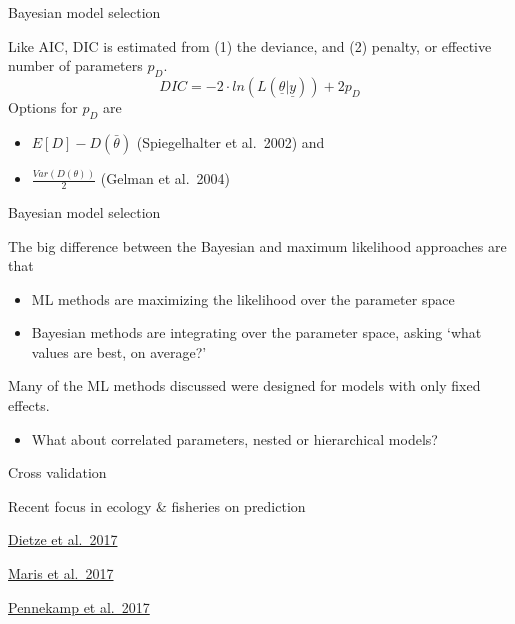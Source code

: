 \documentclass[ignorenonframetext,]{beamer}
\providecommand{\tightlist}{%
  \setlength{\itemsep}{0pt}\setlength{\parskip}{0pt}}
\begin{document}
\begin{frame}[fragile]
\begin{block}{Bayesian model selection}

Like AIC, DIC is estimated from (1) the deviance, and (2) penalty, or
effective number of parameters \(p_{D}\).
\[DIC = -2\cdot ln\left( L(\underline { \theta } |\underline { y  } ) \right) + 2p_{D}\]
Options for \(p_{D}\) are

\begin{itemize}
\item
  \(E[D]-D\left( \bar { \theta } \right)\) (Spiegelhalter et al.~2002)
  and
\item
  \(\frac { Var(D\left( \theta \right) ) }{ 2 }\) (Gelman et al.~2004)
\end{itemize}

\end{block}

\begin{block}{Bayesian model selection}

The big difference between the Bayesian and maximum likelihood
approaches are that

\begin{itemize}
\tightlist
\item
  ML methods are maximizing the likelihood over the parameter space
\item
  Bayesian methods are integrating over the parameter space, asking
  `what values are best, on average?'
\end{itemize}

Many of the ML methods discussed were designed for models with only
fixed effects.

\begin{itemize}
\tightlist
\item
  What about correlated parameters, nested or hierarchical models?
\end{itemize}

\end{block}

\begin{block}{Cross validation}

Recent focus in ecology \& fisheries on prediction

\href{https://esajournals.onlinelibrary.wiley.com/doi/full/10.1002/eap.1589}{Dietze
et al.~2017}

\href{https://onlinelibrary.wiley.com/doi/full/10.1111/oik.04655}{Maris
et al.~2017}

\href{https://www.sciencedirect.com/science/article/pii/S1476945X16301106}{Pennekamp
et al.~2017}


\end{block}
\end{frame}
\end{document}
